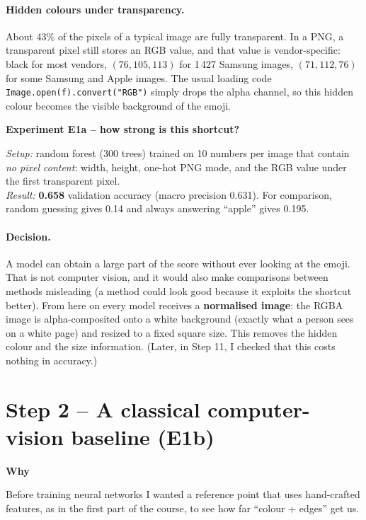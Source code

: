 \documentclass[11pt,a4paper]{article}
\newcommand{\code}[1]{\texttt{#1}}
\newenvironment{stepbox}[1]{\par\medskip\noindent\textbf{#1}\par\nopagebreak}{\par}
\begin{document}
\paragraph{Hidden colours under transparency.} About 43\% of the pixels of a typical image are fully
transparent. In a PNG, a transparent pixel still stores an RGB value, and that value is
vendor-specific: black for most vendors, $(76,105,113)$ for 1\,427 Samsung images, $(71,112,76)$ for
some Samsung and Apple images. The usual loading code \code{Image.open(f).convert("RGB")} simply drops
the alpha channel, so this hidden colour becomes the visible background of the emoji.

\begin{stepbox}{Experiment E1a -- how strong is this shortcut?}
\emph{Setup:} random forest (300 trees) trained on 10 numbers per image that contain \emph{no
pixel content}: width, height, one-hot PNG mode, and the RGB value under the first transparent pixel.\\
\emph{Result:} \textbf{0.658} validation accuracy (macro precision 0.631). For comparison, random
guessing gives 0.14 and always answering ``apple'' gives 0.195.
\end{stepbox}

\paragraph{Decision.} A model can obtain a large part of the score without ever looking at the
emoji. That is not computer vision, and it would also make comparisons between methods
misleading (a method could look good because it exploits the shortcut better). From here on every
model receives a \textbf{normalised image}: the RGBA image is alpha-composited onto a white
background (exactly what a person sees on a white page) and resized to a fixed square size. This
removes the hidden colour and the size information. (Later, in Step 11, I checked that this costs
nothing in accuracy.)

\section{Step 2 -- A classical computer-vision baseline (E1b)}

\begin{stepbox}{Why}
Before training neural networks I wanted a reference point that uses hand-crafted features, as in
the first part of the course, to see how far ``colour + edges'' get us.
\end{stepbox}
\end{document}
